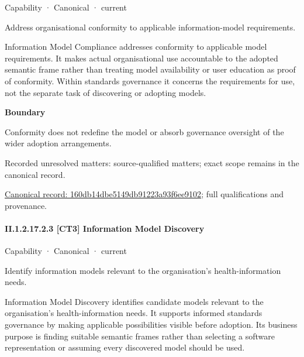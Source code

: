 \label{element:160db14dbe5149db91223a93f6ee9102}
{\small Capability · Canonical · current}\par

Address organisational conformity to applicable information-model requirements.



Information Model Compliance addresses conformity to applicable model requirements. It makes actual organisational use accountable to the adopted semantic frame rather than treating model availability or user education as proof of conformity. Within standards governance it concerns the requirements for use, not the separate task of discovering or adopting models.



\textbf{Boundary}



Conformity does not redefine the model or absorb governance oversight of the wider adoption arrangements.


{\small Recorded unresolved matters: source-qualified matters; exact scope remains in the canonical record.}\par
{\footnotesize \href{../../../../../../../continuum/strategy/capability/160db14dbe5149db91223a93f6ee9102.md}{Canonical record: 160db14dbe5149db91223a93f6ee9102}; full qualifications and provenance.}\par
\paragraph*{II.1.2.17.2.3 [CT3] Information Model Discovery}
\label{navigation:II.1.2.17.2.3}

\label{element:f33dc5b8ba9643329bb7b9431e1f9a6f}
{\small Capability · Canonical · current}\par

Identify information models relevant to the organisation’s health-information needs.



Information Model Discovery identifies candidate models relevant to the organisation's health-information needs. It supports informed standards governance by making applicable possibilities visible before adoption. Its business purpose is finding suitable semantic frames rather than selecting a software representation or assuming every discovered model should be used.



